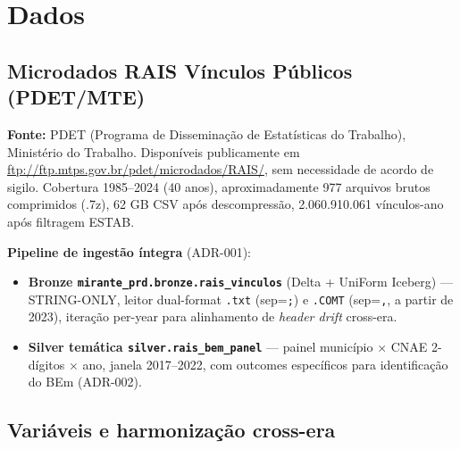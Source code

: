 \documentclass[12pt,a4paper,oneside]{article}
\begin{document}
\section{Dados}

\subsection{Microdados RAIS Vínculos Públicos (PDET/MTE)}

\textbf{Fonte:} PDET (Programa de Disseminação de Estatísticas do Trabalho),
Ministério do Trabalho. Disponíveis publicamente em
\url{ftp://ftp.mtps.gov.br/pdet/microdados/RAIS/}, sem necessidade de
acordo de sigilo. Cobertura 1985--2024 (40 anos), aproximadamente 977
arquivos brutos comprimidos (.7z), 62 GB CSV após descompressão,
2.060.910.061 vínculos-ano após filtragem ESTAB.

\textbf{Pipeline de ingestão íntegra} (ADR-001):

\begin{itemize}
  \item \textbf{Bronze \texttt{mirante\_prd.bronze.rais\_vinculos}}
        (Delta + UniForm Iceberg) --- STRING-ONLY, leitor dual-format
        \texttt{.txt} (sep=\texttt{;}) e \texttt{.COMT} (sep=\texttt{,},
        a partir de 2023), iteração per-year para alinhamento de
        \textit{header drift} cross-era.
  \item \textbf{Silver temática \texttt{silver.rais\_bem\_panel}} ---
        painel município $\times$ CNAE 2-dígitos $\times$ ano,
        janela 2017--2022, com outcomes específicos para identificação
        do BEm (ADR-002).
\end{itemize}

\subsection{Variáveis e harmonização cross-era}
\end{document}
